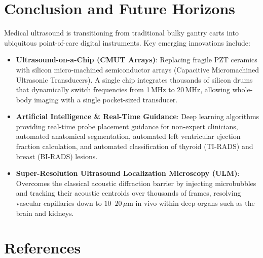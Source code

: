 \documentclass[11pt,a4paper]{article}
\begin{document}
\section{Conclusion and Future Horizons}

Medical ultrasound is transitioning from traditional bulky gantry carts into ubiquitous point-of-care digital instruments. Key emerging innovations include:
\begin{itemize}[leftmargin=*]
    \item \textbf{Ultrasound-on-a-Chip (CMUT Arrays)}: Replacing fragile PZT ceramics with silicon micro-machined semiconductor arrays (Capacitive Micromachined Ultrasonic Transducers). A single chip integrates thousands of silicon drums that dynamically switch frequencies from 1\,MHz to 20\,MHz, allowing whole-body imaging with a single pocket-sized transducer.
    \item \textbf{Artificial Intelligence \& Real-Time Guidance}: Deep learning algorithms providing real-time probe placement guidance for non-expert clinicians, automated anatomical segmentation, automated left ventricular ejection fraction calculation, and automated classification of thyroid (TI-RADS) and breast (BI-RADS) lesions.
    \item \textbf{Super-Resolution Ultrasound Localization Microscopy (ULM)}: Overcomes the classical acoustic diffraction barrier by injecting microbubbles and tracking their acoustic centroids over thousands of frames, resolving vascular capillaries down to $10\text{--}20\,\mu\text{m}$ in vivo within deep organs such as the brain and kidneys.
\end{itemize}

\section*{References}
\end{document}
